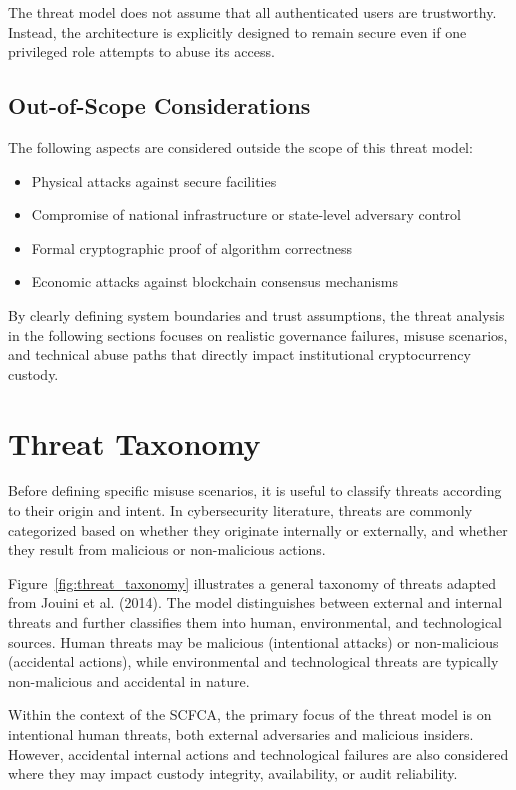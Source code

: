 \documentclass[12pt,a4paper]{report}
\begin{document}
The threat model does not assume that all authenticated users are trustworthy. Instead, the architecture is explicitly designed to remain secure even if one privileged role attempts to abuse its access.

\subsection{Out-of-Scope Considerations}

The following aspects are considered outside the scope of this threat model:

\begin{itemize}
    \item Physical attacks against secure facilities
    \item Compromise of national infrastructure or state-level adversary control
    \item Formal cryptographic proof of algorithm correctness
    \item Economic attacks against blockchain consensus mechanisms
\end{itemize}

By clearly defining system boundaries and trust assumptions, the threat analysis in the following sections focuses on realistic governance failures, misuse scenarios, and technical abuse paths that directly impact institutional cryptocurrency custody.
\section{Threat Taxonomy}

Before defining specific misuse scenarios, it is useful to classify threats according to their origin and intent. In cybersecurity literature, threats are commonly categorized based on whether they originate internally or externally, and whether they result from malicious or non-malicious actions.

Figure~\ref{fig:threat_taxonomy} illustrates a general taxonomy of threats adapted from Jouini et al. (2014). The model distinguishes between external and internal threats and further classifies them into human, environmental, and technological sources. Human threats may be malicious (intentional attacks) or non-malicious (accidental actions), while environmental and technological threats are typically non-malicious and accidental in nature.

Within the context of the SCFCA, the primary focus of the threat model is on intentional human threats, both external adversaries and malicious insiders. However, accidental internal actions and technological failures are also considered where they may impact custody integrity, availability, or audit reliability.
\end{document}
